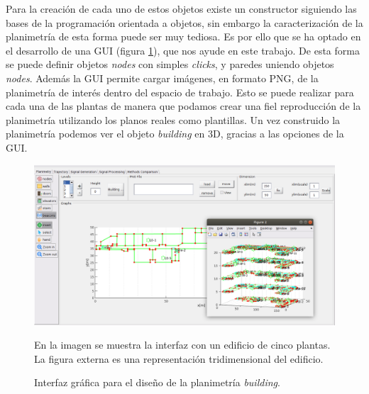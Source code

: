 Para la creación de cada uno de estos objetos existe un constructor siguiendo las bases de la programación orientada a objetos, sin embargo la caracterización de la planimetría de esta forma puede ser muy tediosa. Es por ello que se ha optado en el desarrollo de una GUI (figura \ref{fig:interfaz1}), que nos ayude en este trabajo. De esta forma se puede definir objetos \emph{nodes} con simples \emph{clicks}, y paredes uniendo objetos \emph{nodes}. Además la GUI permite cargar imágenes, en formato PNG, de la planimetría de interés dentro del espacio de trabajo. Esto se puede realizar para cada una de las plantas de manera que podamos crear una fiel reproducción de la planimetría utilizando los planos reales como plantillas. Un vez construido la planimetría podemos ver el objeto \emph{building} en 3D, gracias a las opciones de la GUI.


\begin{figure}
    \centering
    \includegraphics[width=1.00\columnwidth]{img/Design/1.PNG}
    \caption{Interfaz gráfica para el diseño de la planimetría \emph{building}.}
    \footnotesize
    En la imagen se muestra la interfaz con un edificio de cinco plantas. La figura externa es una representación tridimensional del edificio.
    \label{fig:interfaz1}
\end{figure}



